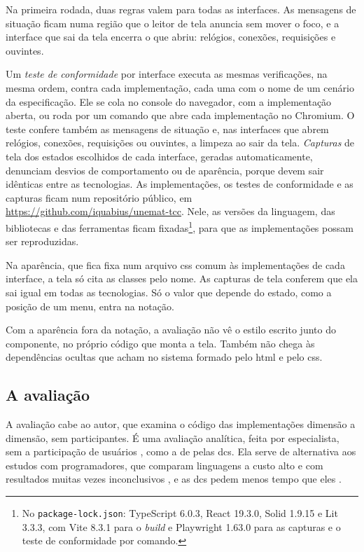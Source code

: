 Na primeira rodada, duas regras valem para todas as interfaces.
As mensagens de situação ficam numa região que o leitor de tela anuncia
sem mover o foco, e a interface que sai da tela encerra o que abriu:
relógios, conexões, requisições e ouvintes.

Um \emph{teste de conformidade} por interface executa as mesmas verificações,
na mesma ordem, contra cada implementação, cada uma com o nome de um
cenário da especificação.
Ele se cola no console do navegador, com a implementação aberta, ou roda
por um comando que abre cada implementação no Chromium.
O teste confere também as mensagens de situação e, nas interfaces que
abrem relógios, conexões, requisições ou ouvintes, a limpeza ao sair da
tela.
\emph{Capturas} de tela dos estados escolhidos de cada interface, geradas
automaticamente, denunciam desvios de comportamento ou de aparência,
porque devem sair idênticas entre as tecnologias.
As implementações, os testes de conformidade e as capturas ficam num
repositório público, em \url{https://github.com/iquabius/unemat-tcc}.
Nele, as versões da linguagem, das bibliotecas e das ferramentas ficam
fixadas\footnote{No \texttt{package-lock.json}: TypeScript 6.0.3, React 19.3.0,
Solid 1.9.15 e Lit 3.3.3, com Vite 8.3.1 para o \emph{build} e Playwright
1.63.0 para as capturas e o teste de conformidade por comando.}, para que as implementações possam ser reproduzidas.

Na aparência, que fica fixa num arquivo \gls{css} comum às
implementações de cada interface, a tela só cita as classes pelo nome.
As capturas de tela conferem que ela sai igual em todas as tecnologias.
Só o valor que depende do estado, como a posição de um menu, entra na
notação.

Com a aparência fora da notação, a avaliação não vê o estilo escrito
junto do componente, no próprio código que monta a tela.
Também não chega às dependências ocultas que
\textcite[p. 342]{green2006} acham no sistema formado pelo \gls{html}
e pelo \gls{css}.
\subsection{A avaliação}
\label{sec:a-avaliacao}

A avaliação cabe ao autor, que examina o código das implementações dimensão
a dimensão, sem participantes.
É uma avaliação analítica, feita por especialista, sem a participação de
usuários \cite{blandford2008}, como a de \textcite[p. 8]{kiss2014} pelas
\glspl{dc}.
Ela serve de alternativa aos estudos com programadores, que comparam
linguagens a custo alto e com resultados muitas vezes inconclusivos
\cite[p. 9]{sadowski2011}, e as \glspl{dc} pedem menos tempo que eles
\cite{dagit2006}.

